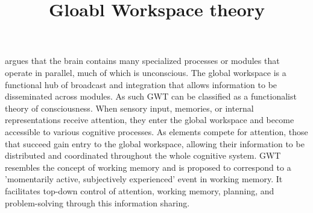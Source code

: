 \documentclass[a4paper]{article}
\title{Gloabl Workspace theory}
\date{}
\begin{document}
    \maketitle
     argues that the brain contains many specialized processes or modules that operate in parallel, much of which is unconscious. The global workspace is a functional hub of broadcast and integration that allows information to be disseminated across modules. As such GWT can be classified as a functionalist theory of consciousness. When sensory input, memories, or internal representations receive attention, they enter the global workspace and become accessible to various cognitive processes. As elements compete for attention, those that succeed gain entry to the global workspace, allowing their information to be distributed and coordinated throughout the whole cognitive system. GWT resembles the concept of working memory and is proposed to correspond to a 'momentarily active, subjectively experienced' event in working memory. It facilitates top-down control of attention, working memory, planning, and problem-solving through this information sharing.
\end{document}
